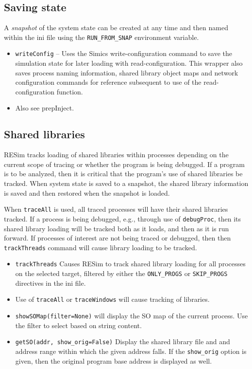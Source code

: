 \documentclass[titlepage]{article}
\begin{document}
\subsection{Saving state}
A \textit{snapshot} of the system state can be created at any time and then named within the ini file using the {\tt RUN\_FROM\_SNAP} environment variable.

\begin{itemize}
\item {\tt writeConfig} – Uses the Simics write-configuration command to save the simulation state for later loading with read-configuration.  This wrapper also saves process naming information, shared library object maps and network configuration commands for reference subsequent to use of the read-configuration function.
\item Also see prepInject.
\end{itemize}

\subsection{Shared libraries}
\label{shared-libs}
RESim tracks loading of shared libraries within processes depending on the current scope of tracing or whether the program
is being debugged.
If a program is to be analyzed, then it is critical that the program's use of shared libraries be tracked.  When system state is 
saved to a snapshot, the shared library information is saved and then restored when the snapshot is loaded.

When {\tt traceAll} is used, all traced processes will have their shared libraries tracked.  If a process is being debugged, e.g.,
through use of {\tt debugProc}, then its shared library loading will be tracked both as it loads, and then as it is run forward.
If processes of interest are not being traced or debugged, then then {\tt trackThreads} command will cause library loading to be tracked.

\begin{itemize}
\item {\tt trackThreads} Causes RESim to track shared library loading for all processes on the selected target, filtered by either the
{\tt ONLY\_PROGS} or {\tt SKIP\_PROGS} directives in the ini file.  
\item Use of {\tt traceAll} or {\tt traceWindows} will cause tracking of libraries.
\item {\tt showSOMap(filter=None)} will display the SO map of the current process.  Use the filter to select based on string content.
\item {\tt getSO(addr, show\_orig=False)} Display the shared library file and and address range within which the given address falls.
If the {\tt show\_orig} option is given, then the original program base address is displayed as well.
\end{itemize}
\end{document}
